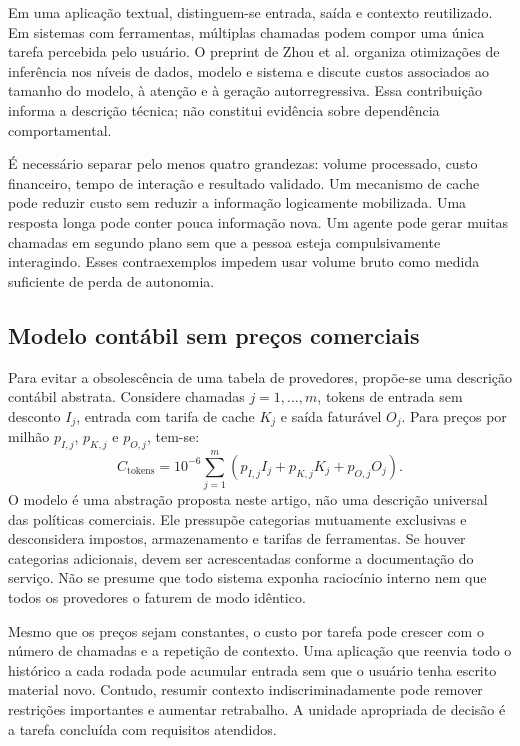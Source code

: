 \documentclass[11pt,a4paper]{article}
\begin{document}
Em uma aplicação textual, distinguem-se entrada, saída e contexto reutilizado. Em sistemas com ferramentas, múltiplas chamadas podem compor uma única tarefa percebida pelo usuário. O preprint de Zhou et al. \cite{zhou} organiza otimizações de inferência nos níveis de dados, modelo e sistema e discute custos associados ao tamanho do modelo, à atenção e à geração autorregressiva. Essa contribuição informa a descrição técnica; não constitui evidência sobre dependência comportamental.

É necessário separar pelo menos quatro grandezas: volume processado, custo financeiro, tempo de interação e resultado validado. Um mecanismo de cache pode reduzir custo sem reduzir a informação logicamente mobilizada. Uma resposta longa pode conter pouca informação nova. Um agente pode gerar muitas chamadas em segundo plano sem que a pessoa esteja compulsivamente interagindo. Esses contraexemplos impedem usar volume bruto como medida suficiente de perda de autonomia.

\subsection{Modelo contábil sem preços comerciais}
Para evitar a obsolescência de uma tabela de provedores, propõe-se uma descrição contábil abstrata. Considere chamadas $j=1,\ldots,m$, tokens de entrada sem desconto $I_j$, entrada com tarifa de cache $K_j$ e saída faturável $O_j$. Para preços por milhão $p_{I,j}$, $p_{K,j}$ e $p_{O,j}$, tem-se:
\begin{equation}
C_{\mathrm{tokens}}=10^{-6}\sum_{j=1}^{m}\left(p_{I,j}I_j+p_{K,j}K_j+p_{O,j}O_j\right).
\end{equation}
O modelo é uma abstração proposta neste artigo, não uma descrição universal das políticas comerciais. Ele pressupõe categorias mutuamente exclusivas e desconsidera impostos, armazenamento e tarifas de ferramentas. Se houver categorias adicionais, devem ser acrescentadas conforme a documentação do serviço. Não se presume que todo sistema exponha raciocínio interno nem que todos os provedores o faturem de modo idêntico.

Mesmo que os preços sejam constantes, o custo por tarefa pode crescer com o número de chamadas e a repetição de contexto. Uma aplicação que reenvia todo o histórico a cada rodada pode acumular entrada sem que o usuário tenha escrito material novo. Contudo, resumir contexto indiscriminadamente pode remover restrições importantes e aumentar retrabalho. A unidade apropriada de decisão é a tarefa concluída com requisitos atendidos.
\end{document}
